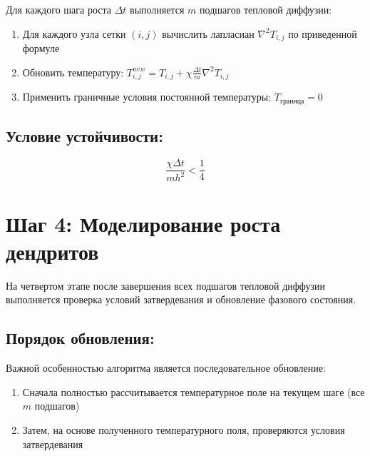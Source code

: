 \documentclass[
  12pt,
  a4paper,
  DIV=11,
  numbers=noendperiod]{scrreprt}
\begin{document}
Для каждого шага роста \(\Delta t\) выполняется \(m\) подшагов тепловой
диффузии:

\begin{enumerate}
\def\labelenumi{\arabic{enumi}.}
\item
  Для каждого узла сетки \((i, j)\) вычислить лапласиан
  \(\nabla^2 T_{i,j}\) по приведенной формуле
\item
  Обновить температуру:
  \(T_{i,j}^{new} = T_{i,j} + \chi \frac{\Delta t}{m} \nabla^2 T_{i,j}\)
\item
  Применить граничные условия постоянной температуры:
  \(T_{граница} = 0\)
\end{enumerate}

\subsection{Условие
устойчивости:}\label{ux443ux441ux43bux43eux432ux438ux435-ux443ux441ux442ux43eux439ux447ux438ux432ux43eux441ux442ux438}

\[
\frac{\chi \Delta t}{m h^2} < \frac{1}{4}
\]

\section{Шаг 4: Моделирование роста
дендритов}\label{ux448ux430ux433-4-ux43cux43eux434ux435ux43bux438ux440ux43eux432ux430ux43dux438ux435-ux440ux43eux441ux442ux430-ux434ux435ux43dux434ux440ux438ux442ux43eux432}

На четвертом этапе после завершения всех подшагов тепловой диффузии
выполняется проверка условий затвердевания и обновление фазового
состояния.

\subsection{Порядок
обновления:}\label{ux43fux43eux440ux44fux434ux43eux43a-ux43eux431ux43dux43eux432ux43bux435ux43dux438ux44f}

Важной особенностью алгоритма является последовательное обновление:

\begin{enumerate}
\def\labelenumi{\arabic{enumi}.}
\item
  Сначала полностью рассчитывается температурное поле на текущем шаге
  (все \(m\) подшагов)
\item
  Затем, на основе полученного температурного поля, проверяются условия
  затвердевания
\end{enumerate}
\end{document}
